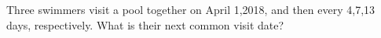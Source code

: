 Three swimmers visit a pool together on April 1,2018, and then every 4,7,13 days, respectively. What is their next common visit date?
